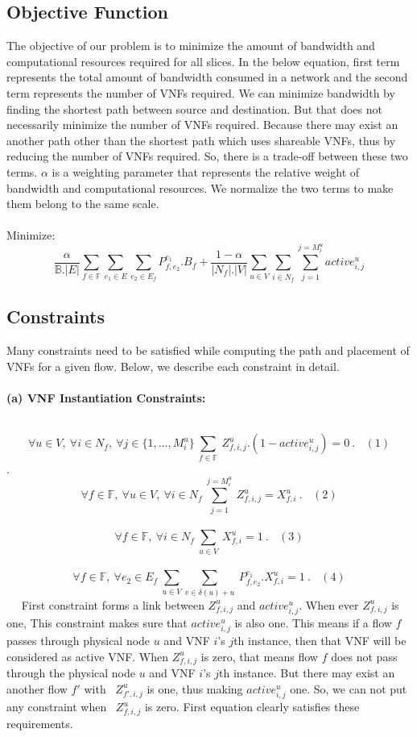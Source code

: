 \documentclass{article}
\begin{document}
\subsection{Objective Function}

The objective of our problem is to minimize the amount of bandwidth and computational resources required for all slices. In the below equation, first term represents the total amount of bandwidth consumed in a network and the second term represents the number of VNFs required. We can minimize bandwidth by finding the shortest path between source and destination. But that does not necessarily minimize the number of VNFs required. Because there may exist an another path other than the shortest path which uses shareable VNFs, thus by reducing the number of VNFs required. So, there is a trade-off between these two terms. \(\alpha\) is a weighting parameter that represents the relative weight of bandwidth and computational resources. We normalize the two terms to make them belong to the same scale.\\
\\
Minimize: \[\frac{\alpha}{\mathbb{B}.|E|}\sum_{f\in \mathbb{F}}\sum_{e_1\in E}\sum_{e_2\in E_f} P_{f,e_2}^{e_1}.B_f + \frac{1-\alpha}{|N_f|.|V|}\sum_{u\in V}\sum_{i\in N_f}\sum_{j=1}^{j=M_i^u}active_{i,j}^u\]


\subsection{Constraints}

Many constraints need to be satisfied while computing the path and placement of VNFs for a given flow. Below, we describe each constraint in detail.
\\
\\
\textbf{(a) VNF Instantiation Constraints:}


 \[\forall{u\in V},\  \forall{i\in N_f},\ \forall{j\in \{1,...,M_i^u\}} \ \sum_{f\in \mathbb{F}}\  Z_{f,i,j}^u . (1-active_{i,j}^u) = 0\ .\ \ \ \ (1)\].
 
 \[\forall{f \in \mathbb{F}},\ \forall{u\in V},\ \forall{i\in N_f}\ \sum_{j=1}^{j=M_i^u} \ Z_{f,i,j}^u = X_{f,i}^u\ .\ \ \ \ (2)\]
 
 \[\forall{f \in \mathbb{F}},\ \forall{i\in N_f}\ \sum_{u\in V} \ X_{f,i}^u = 1\ .\ \ \ \ (3)\]
 
 \[\forall{f \in \mathbb{F}},\ \forall{e_2 \in E_f} \ \sum_{u \in V}\sum_{v \in \delta(u)+u}\ P_{f,e_2}^{e_1}.X_{f,i}^u = 1\ .\ \ \ \ (4)\]
 
 First constraint forms a link between \(Z_{f,i,j}^u\) and \(active_{i,j}^u\). When ever \(Z_{f,i,j}^u\) is one, This constraint makes sure that \(active_{i,j}^u\) is also one. This means if a flow \(f\) passes through physical node \(u\) and VNF \(i\)'s \(j\)th instance, then that VNF will be considered as active VNF. When \(Z_{f,i,j}^u\) is zero, that means flow \(f\) does not pass through the physical node \(u\) and VNF \(i\)'s \(j\)th instance. But there may exist an another flow \(f'\) with  \(Z_{f',i,j}^u\) is one, thus making \(active_{i,j}^u\) one. So, we can not put any constraint when  \(Z_{f,i,j}^u\) is zero. First equation clearly satisfies these requirements.
\end{document}

